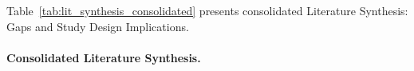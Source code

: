 



\noindent Table~\ref{tab:lit_synthesis_consolidated} presents consolidated Literature Synthesis: Gaps and Study Design Implications.

\paragraph{Consolidated Literature Synthesis.}



